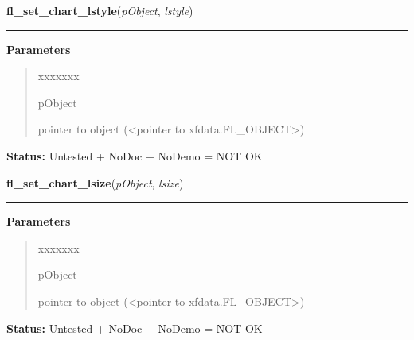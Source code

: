 \hspace{.8\funcindent}\begin{boxedminipage}{\funcwidth}

    \raggedright \textbf{fl\_set\_chart\_lstyle}(\textit{pObject}, \textit{lstyle})

    \vspace{-1.5ex}

    \rule{\textwidth}{0.5\fboxrule}
\setlength{\parskip}{2ex}
\setlength{\parskip}{1ex}
      \textbf{Parameters}
      \vspace{-1ex}

      \begin{quote}
        \begin{Ventry}{xxxxxxx}

          \item[pObject]

          pointer to object ({\textless}pointer to 
          xfdata.FL\_OBJECT{\textgreater})

        \end{Ventry}

      \end{quote}

\textbf{Status:} Untested + NoDoc + NoDemo = NOT OK



    \end{boxedminipage}

    \label{xformslib:library:fl_set_chart_lsize}

    \vspace{0.5ex}

\hspace{.8\funcindent}\begin{boxedminipage}{\funcwidth}

    \raggedright \textbf{fl\_set\_chart\_lsize}(\textit{pObject}, \textit{lsize})

    \vspace{-1.5ex}

    \rule{\textwidth}{0.5\fboxrule}
\setlength{\parskip}{2ex}
\setlength{\parskip}{1ex}
      \textbf{Parameters}
      \vspace{-1ex}

      \begin{quote}
        \begin{Ventry}{xxxxxxx}

          \item[pObject]

          pointer to object ({\textless}pointer to 
          xfdata.FL\_OBJECT{\textgreater})

        \end{Ventry}

      \end{quote}

\textbf{Status:} Untested + NoDoc + NoDemo = NOT OK



    \end{boxedminipage}

